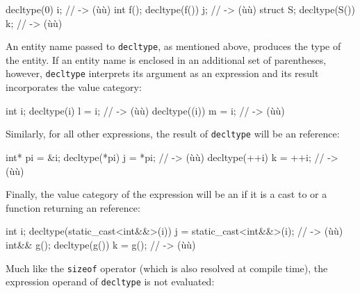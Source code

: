 \begin{emcppslisting}
decltype(0)   i; // -> (ù{}ù)
int f();
decltype(f()) j; // -> (ù{}ù)
struct S{};
decltype(S()) k; // -> (ù{}ù)
\end{emcppslisting}

\noindent An entity name passed to \lstinline!decltype!, as mentioned above, produces the type of the entity. If an entity name is enclosed in an additional set of parentheses, however, \lstinline!decltype! interprets its argument as an expression and its result incorporates the value category:

\begin{emcppslisting}[emcppsbatch=e2]
int i;
decltype(i)   l = i; // -> (ù{}ù)
decltype((i)) m = i; // -> (ù{}ù)
\end{emcppslisting}

\noindent Similarly, for all other  expressions, the result of \lstinline!decltype! will be an  reference:

\begin{emcppslisting}[emcppsbatch=e2]
int* pi = &i;
decltype(*pi) j = *pi; // -> (ù{}ù)
decltype(++i) k = ++i; // -> (ù{}ù)
\end{emcppslisting}

\noindent Finally, the value category of the expression will be an  if it is a cast to or a function returning an  reference:

\begin{emcppslisting}
int i;
decltype(static_cast<int&&>(i)) j = static_cast<int&&>(i); // -> (ù{}ù)
int&& g();
decltype(g()) k = g();                                     // -> (ù{}ù)
\end{emcppslisting}


\noindent Much like the \lstinline!sizeof!
operator (which is also resolved at compile time), the expression operand of \lstinline!decltype! is not evaluated:

